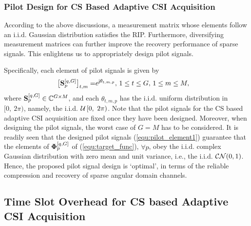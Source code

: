 \documentclass[final]{IEEEtran}
\begin{document}
\subsubsection{Pilot Design for CS Based Adaptive CSI Acquisition}

 According to the above discussions, a measurement matrix whose elements follow an i.i.d.
 Gaussian distribution satisfies the RIP. Furthermore, diversifying measurement matrices
 can further improve the recovery performance of sparse signals. This  enlightens us to
 appropriately design pilot signals.

 Specifically, each element of pilot signals is given by
\begin{align}\label{equ:pilot_element1} %
 \big[ {\bf S}_p^{[q,G]}\big]_{t,m} =& e^{\textsf{j}\theta_{t,m,p}} , \, 1\le t \le G,
 \, 1\le m \le M ,
\end{align}
 where ${\bf S}_p^{[q,G]}\in\mathbb{C}^{G\times M}$, and each $\theta_{t,m,p}$ has the
 i.i.d. uniform distribution in $[0, ~ 2\pi)$, namely, the i.i.d.
 ${\cal{U}}\left[ 0, ~ 2\pi\right)$. Note that the pilot signals for the CS based adaptive
 CSI acquisition are fixed once they have been designed. Moreover, when designing the pilot
 signals, the worst case of $G=M$ has to be considered. It is readily seen that
 the designed pilot signals (\ref{equ:pilot_element1}) guarantee that the elements of
 ${\bf{\Phi}}_p^{[q,G]}$ of (\ref{equ:target_func}), $\forall p$,  obey the i.i.d. complex
 Gaussian distribution with zero mean and unit variance, i.e., the i.i.d. ${\cal{CN}}(0,1)$.
 Hence, the proposed pilot signal design is `optimal', in terms of the reliable compression
 and recovery of sparse angular domain channels.

\subsection{Time Slot Overhead for CS based Adaptive CSI Acquisition}\label{S4.2}
\end{document}

